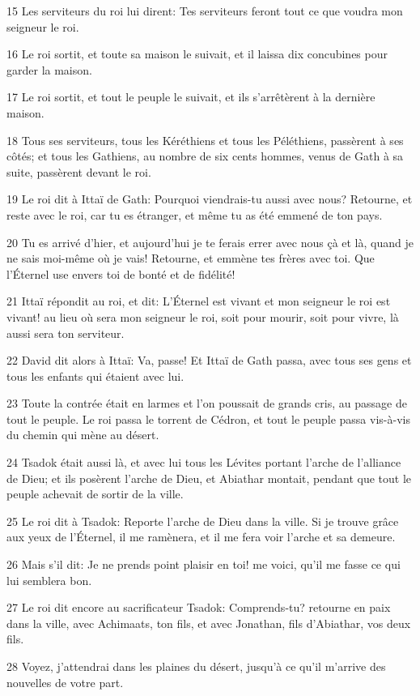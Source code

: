 \par 15 Les serviteurs du roi lui dirent: Tes serviteurs feront tout ce que voudra mon seigneur le roi.
\par 16 Le roi sortit, et toute sa maison le suivait, et il laissa dix concubines pour garder la maison.
\par 17 Le roi sortit, et tout le peuple le suivait, et ils s'arrêtèrent à la dernière maison.
\par 18 Tous ses serviteurs, tous les Kéréthiens et tous les Péléthiens, passèrent à ses côtés; et tous les Gathiens, au nombre de six cents hommes, venus de Gath à sa suite, passèrent devant le roi.
\par 19 Le roi dit à Ittaï de Gath: Pourquoi viendrais-tu aussi avec nous? Retourne, et reste avec le roi, car tu es étranger, et même tu as été emmené de ton pays.
\par 20 Tu es arrivé d'hier, et aujourd'hui je te ferais errer avec nous çà et là, quand je ne sais moi-même où je vais! Retourne, et emmène tes frères avec toi. Que l'Éternel use envers toi de bonté et de fidélité!
\par 21 Ittaï répondit au roi, et dit: L'Éternel est vivant et mon seigneur le roi est vivant! au lieu où sera mon seigneur le roi, soit pour mourir, soit pour vivre, là aussi sera ton serviteur.
\par 22 David dit alors à Ittaï: Va, passe! Et Ittaï de Gath passa, avec tous ses gens et tous les enfants qui étaient avec lui.
\par 23 Toute la contrée était en larmes et l'on poussait de grands cris, au passage de tout le peuple. Le roi passa le torrent de Cédron, et tout le peuple passa vis-à-vis du chemin qui mène au désert.
\par 24 Tsadok était aussi là, et avec lui tous les Lévites portant l'arche de l'alliance de Dieu; et ils posèrent l'arche de Dieu, et Abiathar montait, pendant que tout le peuple achevait de sortir de la ville.
\par 25 Le roi dit à Tsadok: Reporte l'arche de Dieu dans la ville. Si je trouve grâce aux yeux de l'Éternel, il me ramènera, et il me fera voir l'arche et sa demeure.
\par 26 Mais s'il dit: Je ne prends point plaisir en toi! me voici, qu'il me fasse ce qui lui semblera bon.
\par 27 Le roi dit encore au sacrificateur Tsadok: Comprends-tu? retourne en paix dans la ville, avec Achimaats, ton fils, et avec Jonathan, fils d'Abiathar, vos deux fils.
\par 28 Voyez, j'attendrai dans les plaines du désert, jusqu'à ce qu'il m'arrive des nouvelles de votre part.

